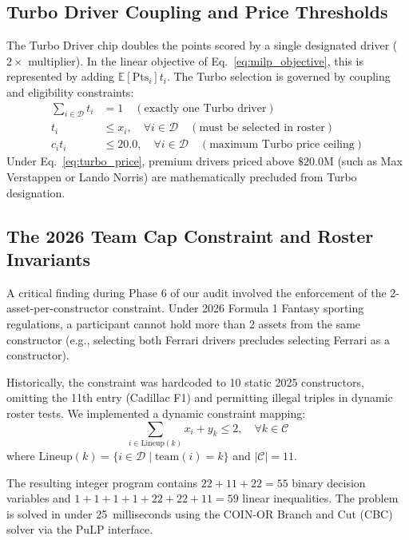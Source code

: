 \subsection{Turbo Driver Coupling and Price Thresholds}
The Turbo Driver chip doubles the points scored by a single designated driver ($2\times$ multiplier). In the linear objective of Eq.~\eqref{eq:milp_objective}, this is represented by adding $\mathbb{E}[\text{Pts}_i] t_i$. The Turbo selection is governed by coupling and eligibility constraints:
\begin{align}
\sum_{i \in \mathcal{D}} t_i &= 1 \quad (\text{exactly one Turbo driver}) \label{eq:turbo_one} \\
t_i &\le x_i, \quad \forall i \in \mathcal{D} \quad (\text{must be selected in roster}) \label{eq:turbo_coupling} \\
c_i t_i &\le 20.0, \quad \forall i \in \mathcal{D} \quad (\text{maximum Turbo price ceiling}) \label{eq:turbo_price}
\end{align}
Under Eq.~\eqref{eq:turbo_price}, premium drivers priced above $\$20.0\text{M}$ (such as Max Verstappen or Lando Norris) are mathematically precluded from Turbo designation.

\subsection{The 2026 Team Cap Constraint and Roster Invariants}
A critical finding during Phase 6 of our audit involved the enforcement of the 2-asset-per-constructor constraint. Under 2026 Formula 1 Fantasy sporting regulations, a participant cannot hold more than 2 assets from the same constructor (e.g., selecting both Ferrari drivers precludes selecting Ferrari as a constructor).

Historically, the constraint was hardcoded to 10 static 2025 constructors, omitting the 11th entry (Cadillac F1) and permitting illegal triples in dynamic roster tests. We implemented a dynamic constraint mapping:
\begin{equation}
\sum_{i \in \text{Lineup}(k)} x_i + y_k \le 2, \quad \forall k \in \mathcal{C}
\label{eq:team_cap}
\end{equation}
where $\text{Lineup}(k) = \{i \in \mathcal{D} \mid \text{team}(i) = k\}$ and $|\mathcal{C}| = 11$.

The resulting integer program contains $22 + 11 + 22 = 55$ binary decision variables and $1 + 1 + 1 + 1 + 22 + 22 + 11 = 59$ linear inequalities. The problem is solved in under 25~milliseconds using the COIN-OR Branch and Cut (CBC) solver via the PuLP interface.
